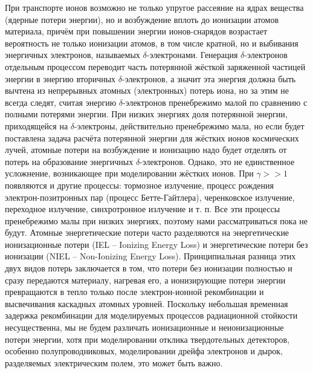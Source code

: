 \documentclass[a4paper,12pt]{article}
\begin{document}
\begin{large}
  При транспорте ионов возможно не только упругое рассеяние на ядрах вещества (ядерные потери энергии), но и возбуждение вплоть до ионизации атомов материала, причём при повышении энергии ионов-снарядов возрастает вероятность не только ионизации атомов, в том числе кратной, но и выбивания энергичных электронов, называемых $\delta$-электронами.
  Генерация $\delta$-электронов отдельным процессом переводит часть потерянной жёсткой заряженной частицей энергии в энергию вторичных $\delta$-электронов, а значит эта энергия должна быть вычтена из непрерывных атомных (электронных) потерь иона, но за этим не всегда следят, считая энергию $\delta$-электронов пренебрежимо малой по сравнению с полными потерями энергии.
  При низких энергиях доля потерянной энергии, приходящейся на $\delta$-электроны, действительно пренебрежимо мала, но если будет поставлена задача расчёта потерянной энергии для жёстких ионов космических лучей, атомные потери на возбуждение и ионизацию надо будет отделять от потерь на образование энергичных $\delta$-электронов.
  Однако, это не единственное усложнение, возникающее при моделировании жёстких ионов.
  При $\gamma >> 1$ появляются и другие процессы: тормозное излучение, процесс рождения электрон-позитронных пар (процесс Бетте-Гайтлера), черенковское излучение, переходное излучение, синхротронное излучение и т. п.
  Все эти процессы пренебрежимо малы при низких энергиях, поэтому нами рассматриваться пока не будут.
  Атомные энергетические потери часто разделяются на энергетические ионизационные потери (IEL -- Ionizing Energy Loss) и энергетические потери без ионизации (NIEL -- Non-Ionizing Energy Loss).
  Принципиальная разница этих двух видов потерь заключается в том, что потери без ионизации полностью и сразу передаются материалу, нагревая его, а ионизирующие потери энергии превращаются в тепло только после электрон-ионной рекомбинации и высвечивания каскадных атомных уровней.
  Поскольку небольшая временная задержка рекомбинации для моделируемых процессов радиационной стойкости несущественна, мы не будем различать ионизационные и неионизационные потери энергии, хотя при моделировании отклика твердотельных детекторов, особенно полупроводниковых, моделировании дрейфа электронов и дырок, разделяемых электрическим полем, это может быть важно.


\end{large}
\end{document}
